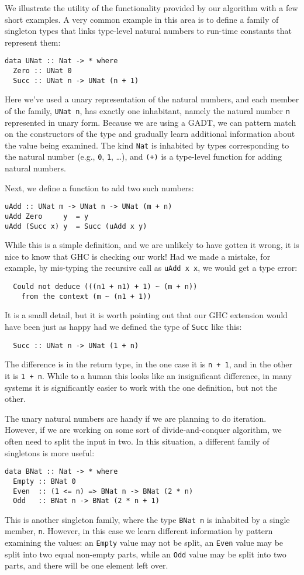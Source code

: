 \documentclass{sigplanconf}
\begin{document}
We illustrate the utility of the functionality provided by our
algorithm with a few short examples.  A very common example in
this area is to define a family of singleton types that links
type-level natural numbers to run-time constants that represent
them:
\begin{Verbatim}
data UNat :: Nat -> * where
  Zero :: UNat 0
  Succ :: UNat n -> UNat (n + 1)
\end{Verbatim}
Here we've used a unary representation of the natural numbers,
and each member of the family, \Verb"UNat n", has exactly one
inhabitant, namely the natural number \Verb"n" represented in
unary form.  Because we are using a GADT, we can pattern match
on the constructors of the type and gradually learn additional
information about the value being examined.  The kind \Verb"Nat"
is inhabited by types corresponding to the natural number
(e.g., \Verb"0", \Verb"1", \dots), and \Verb"(+)" is a type-level
function for adding natural numbers.

Next, we define a function to add two such numbers:
\begin{Verbatim}
uAdd :: UNat m -> UNat n -> UNat (m + n)
uAdd Zero     y  = y
uAdd (Succ x) y  = Succ (uAdd x y)
\end{Verbatim}
While this is a simple definition, and we are unlikely
to have gotten it wrong, it is nice to know that GHC
is checking our work!  Had we made a mistake, for
example, by mis-typing the recursive call as \Verb"uAdd x x",
we would get a type error:
\begin{Verbatim}
  Could not deduce (((n1 + n1) + 1) ~ (m + n))
    from the context (m ~ (n1 + 1))
\end{Verbatim}
It is a small detail, but it is worth pointing out that our
GHC extension would have been just as happy had we defined the type
of \Verb"Succ" like this:
\begin{Verbatim}
  Succ :: UNat n -> UNat (1 + n)
\end{Verbatim}
The difference is in the return type, in the one case it is
\Verb"n + 1", and in the other it is \Verb"1 + n".  While
to a human this looks like an insignificant difference,
in many systems it is significantly easier to work
with the one definition, but not the other.

The unary natural numbers are handy if we are planning to
do iteration.  However, if we are working on some sort of
divide-and-conquer algorithm, we often need to split the
input in two.  In this situation, a different family of
singletons is more useful:
\begin{Verbatim}
data BNat :: Nat -> * where
  Empty :: BNat 0
  Even  :: (1 <= n) => BNat n -> BNat (2 * n)
  Odd   :: BNat n -> BNat (2 * n + 1)
\end{Verbatim}
This is another singleton family, where the type \Verb"BNat n"
is inhabited by a single member, \Verb"n".  However, in this
case we learn different information by pattern examining
the values:  an \Verb"Empty" value may not be split,
an \Verb"Even" value may be split into two equal non-empty
parts, while an \Verb"Odd" value may be split into two parts,
and there will be one element left over.
\end{document}
